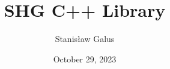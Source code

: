 \documentclass[a4paper,11pt]{report}
\title{SHG C++ Library}
\author{Stanis{\l}aw Galus}
\date{October 29, 2023}
\begin{document}
\begingroup
\renewcommand{\thepage}{0}
\maketitle
\endgroup

\tableofcontents




\end{document}
